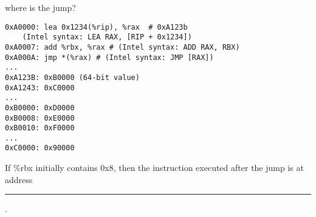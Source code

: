 \begin{frame}[fragile,label=whereIsJumpEx]{where is the jump?}
\begin{Verbatim}[fontsize=\small]
0xA0000: lea 0x1234(%rip), %rax  # 0xA123b
    (Intel syntax: LEA RAX, [RIP + 0x1234])
0xA0007: add %rbx, %rax # (Intel syntax: ADD RAX, RBX)
0xA000A: jmp *(%rax) # (Intel syntax: JMP [RAX])
...
0xA123B: 0xB0000 (64-bit value)
0xA1243: 0xC0000
...
0xB0000: 0xD0000
0xB0008: 0xE0000
0xB0010: 0xF0000
...
0xC0000: 0x90000
\end{Verbatim}
If \%rbx initially contains 0x8, then the instruction
executed after the jump is at address \rule{1cm}{1pt}.
\end{frame}
